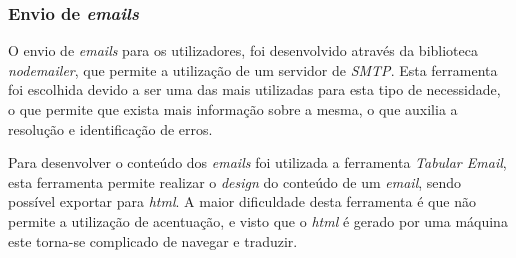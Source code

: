 \subsubsection{Envio de \textit{emails}}
O envio de \textit{emails} para os utilizadores, foi desenvolvido através da biblioteca \textit{nod\textit{email}er}, que permite a utilização de um servidor de \textit{SMTP}. Esta ferramenta foi escolhida devido a ser uma das mais utilizadas para esta tipo de necessidade, o que permite que exista mais informação sobre a mesma, o que auxilia a resolução e identificação de erros. 

Para desenvolver o conteúdo dos \textit{emails} foi utilizada a ferramenta \textit{Tabular Email}, esta ferramenta permite realizar o \textit{design} do conteúdo de um \textit{email}, sendo possível exportar para \textit{html}. A maior dificuldade desta ferramenta é que não permite a utilização de acentuação, e visto que o \textit{html} é gerado por uma máquina este torna-se complicado de navegar e traduzir.